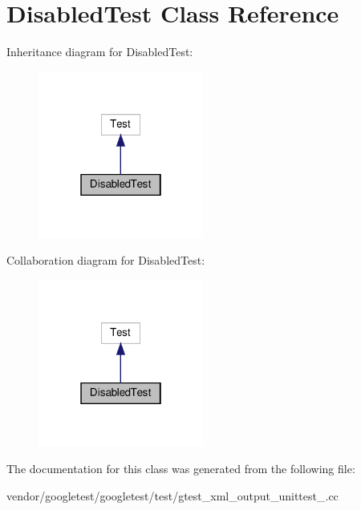 \hypertarget{class_disabled_test}{}\section{Disabled\+Test Class Reference}
\label{class_disabled_test}


Inheritance diagram for Disabled\+Test\+:
\nopagebreak
\begin{figure}[H]
\begin{center}
\leavevmode
\includegraphics[width=154pt]{class_disabled_test__inherit__graph}
\end{center}
\end{figure}


Collaboration diagram for Disabled\+Test\+:
\nopagebreak
\begin{figure}[H]
\begin{center}
\leavevmode
\includegraphics[width=154pt]{class_disabled_test__coll__graph}
\end{center}
\end{figure}


The documentation for this class was generated from the following file\+:\begin{DoxyCompactItemize}
\item 
vendor/googletest/googletest/test/gtest\+\_\+xml\+\_\+output\+\_\+unittest\+\_\+.\+cc\end{DoxyCompactItemize}
